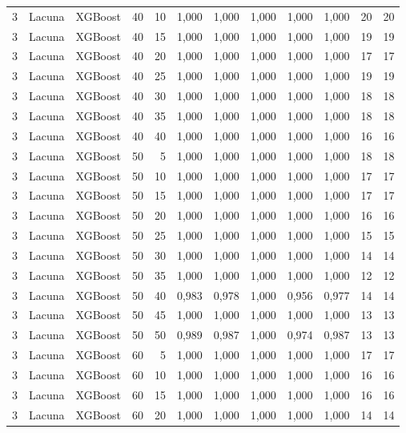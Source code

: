 \begin{longtable}{ccclrrrrrrrr}
3 & Lacuna & XGBoost & 40 & 10 & 1,000 & 1,000 & 1,000 & 1,000 & 1,000 & 20 & 20 \\
3 & Lacuna & XGBoost & 40 & 15 & 1,000 & 1,000 & 1,000 & 1,000 & 1,000 & 19 & 19 \\
3 & Lacuna & XGBoost & 40 & 20 & 1,000 & 1,000 & 1,000 & 1,000 & 1,000 & 17 & 17 \\
3 & Lacuna & XGBoost & 40 & 25 & 1,000 & 1,000 & 1,000 & 1,000 & 1,000 & 19 & 19 \\
3 & Lacuna & XGBoost & 40 & 30 & 1,000 & 1,000 & 1,000 & 1,000 & 1,000 & 18 & 18 \\
3 & Lacuna & XGBoost & 40 & 35 & 1,000 & 1,000 & 1,000 & 1,000 & 1,000 & 18 & 18 \\
3 & Lacuna & XGBoost & 40 & 40 & 1,000 & 1,000 & 1,000 & 1,000 & 1,000 & 16 & 16 \\
3 & Lacuna & XGBoost & 50 & 5 & 1,000 & 1,000 & 1,000 & 1,000 & 1,000 & 18 & 18 \\
3 & Lacuna & XGBoost & 50 & 10 & 1,000 & 1,000 & 1,000 & 1,000 & 1,000 & 17 & 17 \\
3 & Lacuna & XGBoost & 50 & 15 & 1,000 & 1,000 & 1,000 & 1,000 & 1,000 & 17 & 17 \\
3 & Lacuna & XGBoost & 50 & 20 & 1,000 & 1,000 & 1,000 & 1,000 & 1,000 & 16 & 16 \\
3 & Lacuna & XGBoost & 50 & 25 & 1,000 & 1,000 & 1,000 & 1,000 & 1,000 & 15 & 15 \\
3 & Lacuna & XGBoost & 50 & 30 & 1,000 & 1,000 & 1,000 & 1,000 & 1,000 & 14 & 14 \\
3 & Lacuna & XGBoost & 50 & 35 & 1,000 & 1,000 & 1,000 & 1,000 & 1,000 & 12 & 12 \\
3 & Lacuna & XGBoost & 50 & 40 & 0,983 & 0,978 & 1,000 & 0,956 & 0,977 & 14 & 14 \\
3 & Lacuna & XGBoost & 50 & 45 & 1,000 & 1,000 & 1,000 & 1,000 & 1,000 & 13 & 13 \\
3 & Lacuna & XGBoost & 50 & 50 & 0,989 & 0,987 & 1,000 & 0,974 & 0,987 & 13 & 13 \\
3 & Lacuna & XGBoost & 60 & 5 & 1,000 & 1,000 & 1,000 & 1,000 & 1,000 & 17 & 17 \\
3 & Lacuna & XGBoost & 60 & 10 & 1,000 & 1,000 & 1,000 & 1,000 & 1,000 & 16 & 16 \\
3 & Lacuna & XGBoost & 60 & 15 & 1,000 & 1,000 & 1,000 & 1,000 & 1,000 & 16 & 16 \\
3 & Lacuna & XGBoost & 60 & 20 & 1,000 & 1,000 & 1,000 & 1,000 & 1,000 & 14 & 14 \\

\end{longtable}
